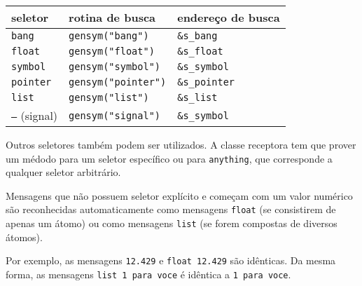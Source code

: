 \begin{center}
\begin{tabular}{|l|l|l|}
\hline
  seletor & rotina de busca & endereço de busca \\
\hline
  \texttt{bang} & \texttt{gensym("bang")} & \texttt{\&s\_bang} \\
  \texttt{float} & \texttt{gensym("float")} & \texttt{\&s\_float} \\
  \texttt{symbol} & \texttt{gensym("symbol")} & \texttt{\&s\_symbol} \\
  \texttt{pointer} & \texttt{gensym("pointer")} & \texttt{\&s\_pointer} \\
  \texttt{list} & \texttt{gensym("list")} & \texttt{\&s\_list} \\
  \texttt{--}  (signal) & \texttt{gensym("signal")} & \texttt{\&s\_symbol} \\
\hline
\end{tabular}
\end{center}

Outros seletores também podem ser utilizados. A classe receptora tem que
prover um médodo para um seletor específico ou para \texttt{anything}, que
corresponde a qualquer seletor arbitrário.

Mensagens que não possuem seletor explícito e começam com um valor numérico
são reconhecidas automaticamente como mensagens \texttt{float} (se consistirem
de apenas um átomo) ou como mensagens \texttt{list} (se forem compostas de
diversos átomos).

Por exemplo, as mensagens \texttt{12.429} e \texttt{float 12.429} são
idênticas. Da mesma forma, as mensagens \texttt{list 1 para voce} é idêntica a
\texttt{1 para voce}.

